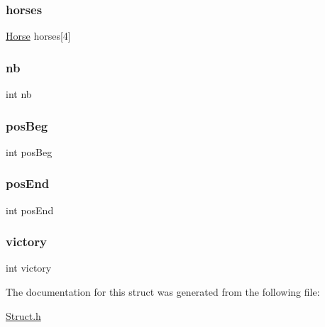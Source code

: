 \mbox{\label{struct_player_aebaeb813cc39287b8d51c8e329921872}} 
\subsubsection{\texorpdfstring{horses}{horses}}
{\footnotesize\ttfamily \hyperlink{struct_horse}{Horse} horses\mbox{[}4\mbox{]}}

\mbox{\label{struct_player_ab310c6afcc676eab3930dce2650511c0}} 
\subsubsection{\texorpdfstring{nb}{nb}}
{\footnotesize\ttfamily int nb}

\mbox{\label{struct_player_a0bb30ad7c22691f6752ebd19291dde0a}} 
\subsubsection{\texorpdfstring{pos\+Beg}{posBeg}}
{\footnotesize\ttfamily int pos\+Beg}

\mbox{\label{struct_player_a8e270698bff1777ec85abad13dec9345}} 
\subsubsection{\texorpdfstring{pos\+End}{posEnd}}
{\footnotesize\ttfamily int pos\+End}

\mbox{\label{struct_player_aa0f4ebda6ab8d3a392af7e069e8cdffa}} 
\subsubsection{\texorpdfstring{victory}{victory}}
{\footnotesize\ttfamily int victory}



The documentation for this struct was generated from the following file\+:\begin{DoxyCompactItemize}
\item 
\hyperlink{_struct_8h}{Struct.\+h}\end{DoxyCompactItemize}
